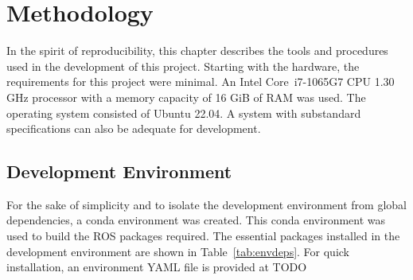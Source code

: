 \chapter{Methodology}\label{cha:methodology}

    In the spirit of reproducibility, this chapter describes the tools and procedures used in the development of this project. Starting with the hardware, the requirements for this project were minimal. An Intel\textsuperscript{\textregistered} Core\texttrademark\ i7-1065G7 CPU 1.30 GHz processor with a memory capacity of 16 GiB of RAM was used. The operating system consisted of Ubuntu 22.04. A system with substandard specifications can also be adequate for development.

\section{Development Environment}

    For the sake of simplicity and to isolate the development environment from global dependencies, a \textsf{conda} environment was created. This \textsf{conda} environment was used to build the \ac{ROS} packages required. The essential packages installed in the development environment are shown in Table~\ref{tab:envdeps}. For quick installation, an environment \ac{YAML} file is provided at TODO

